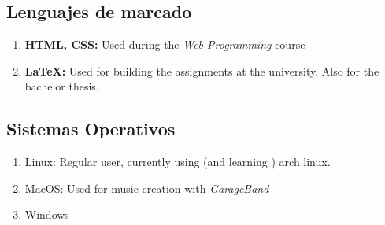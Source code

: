 \documentclass[letterpaper]{twentysecondcv-eng} %
\begin{document}
\subsection{Lenguajes de marcado}
\begin{enumerate}
	\item \textbf{HTML, CSS:} Used during the  {\it Web Programming} course
	\item \textbf{\LaTeX:} Used for building the assignments at the university. Also for the bachelor thesis.
\end{enumerate}

\subsection{Sistemas Operativos}
\begin{enumerate}
	\item Linux: Regular user, currently using (and learning ) arch linux.
	\item MacOS: Used for music creation with  {\it GarageBand}
	\item Windows
\end{enumerate}







\end{document}
